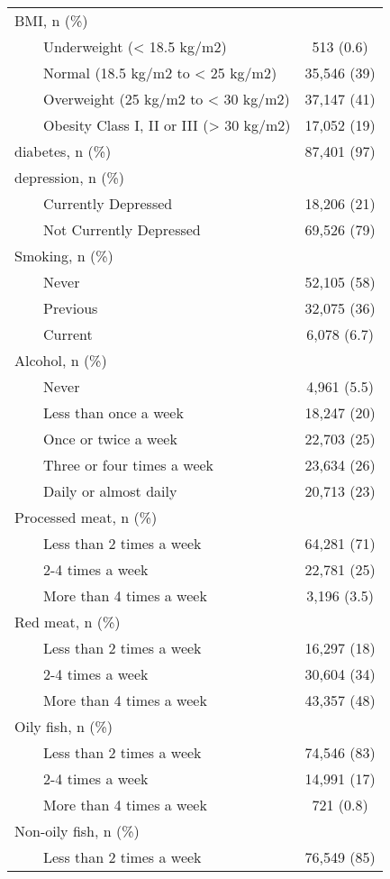 \begin{table}[!t]
\begin{tabular*}{\linewidth}{@{\extracolsep{\fill}}lc}
BMI, n (\%) &  \\ 
    Underweight (< 18.5 kg/m2) & 513 (0.6) \\ 
    Normal (18.5 kg/m2 to < 25 kg/m2) & 35,546 (39) \\ 
    Overweight (25 kg/m2 to < 30 kg/m2) & 37,147 (41) \\ 
    Obesity Class I, II or III (> 30 kg/m2) & 17,052 (19) \\ 
diabetes, n (\%) & 87,401 (97) \\ 
depression, n (\%) &  \\ 
    Currently Depressed & 18,206 (21) \\ 
    Not Currently Depressed & 69,526 (79) \\ 
Smoking, n (\%) &  \\ 
    Never & 52,105 (58) \\ 
    Previous & 32,075 (36) \\ 
    Current & 6,078 (6.7) \\ 
Alcohol, n (\%) &  \\ 
    Never & 4,961 (5.5) \\ 
    Less than once a week & 18,247 (20) \\ 
    Once or twice a week & 22,703 (25) \\ 
    Three or four times a week & 23,634 (26) \\ 
    Daily or almost daily & 20,713 (23) \\ 
Processed meat, n (\%) &  \\ 
    Less than 2 times a week & 64,281 (71) \\ 
    2-4 times a week & 22,781 (25) \\ 
    More than 4 times a week & 3,196 (3.5) \\ 
Red meat, n (\%) &  \\ 
    Less than 2 times a week & 16,297 (18) \\ 
    2-4 times a week & 30,604 (34) \\ 
    More than 4 times a week & 43,357 (48) \\ 
Oily fish, n (\%) &  \\ 
    Less than 2 times a week & 74,546 (83) \\ 
    2-4 times a week & 14,991 (17) \\ 
    More than 4 times a week & 721 (0.8) \\ 
Non-oily fish, n (\%) &  \\ 
    Less than 2 times a week & 76,549 (85) \\ 

\end{tabular*}
\end{table}
